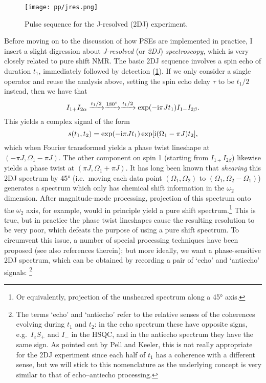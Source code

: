 \begin{figure}[htb]
    \centering
    \texttt{[image: pp/jres.png]}%
    \caption[2DJ pulse sequence]{Pulse sequence for the J-resolved (2DJ) experiment.}
    \label{fig:pp_jres}
\end{figure}

Before moving on to the discussion of how PSEs are implemented in practice, I insert a slight digression about \textit{J-resolved} (or \textit{2DJ}) \textit{spectroscopy}, which is very closely related to pure shift NMR.
The basic 2DJ sequence involves a spin echo of duration $t_1$, immediately followed by detection (\cref{fig:pp_jres}).
If we only consider a single operator and reuse the analysis above, setting the spin echo delay $\tau$ to be $t_1/2$ instead, then we have that
\begin{equation}
    \label{eq:2dj_operator_analysis}
    I_{1+}I_{2\alpha} \xrightarrow[]{t_1/2} \xrightarrow[]{\ang{180}} \xrightarrow[]{t_1/2} \exp(-\mathrm{i} \pi J t_1) I_{1-}I_{2\beta}.
\end{equation}
This yields a complex signal of the form
\begin{equation}
    \label{eq:2dj_signal}
    s(t_1, t_2) = \exp(-\mathrm{i}\pi J t_1) \exp[\mathrm{i}(\Omega_1 - \pi J) t_2],
\end{equation}
which when Fourier transformed yields a phase twist lineshape at $(-\pi J, \Omega_1 - \pi J)$.
The other component on spin 1 (starting from $I_{1+}I_{2\beta}$) likewise yields a phase twist at $(\pi J, \Omega_1 + \pi J)$.
It has long been known that \textit{shearing} this 2DJ spectrum by \ang{45} (i.e.\ moving each data point $(\Omega_1, \Omega_2)$ to $(\Omega_1, \Omega_2 - \Omega_1)$) generates a spectrum which only has chemical shift information in the $\omega_2$ dimension.
After magnitude-mode processing, projection of this spectrum onto the $\omega_2$ axis, for example, would in principle yield a pure shift spectrum.\footnote{Or equivalently, projection of the unsheared spectrum along a \ang{45} axis\autocite{Aue1976JCP}.}
This is true, but in practice the phase twist lineshapes cause the resulting resolution to be very poor, which defeats the purpose of using a pure shift spectrum.
To circumvent this issue, a number of special processing techniques have been proposed\autocite{Xu1991JMR,Nuzillard1996JMRSA,Simova1997JMR} (see also references therein); but more ideally, we want a phase-sensitive 2DJ spectrum, which can be obtained by recording a pair of `echo' and `antiecho' signals:%
\footnote{The terms `echo' and `antiecho' refer to the relative senses of the coherences evolving during $t_1$ and $t_2$: in the echo spectrum these have opposite signs, e.g.\ $I_zS_+$ and $I_-$ in the HSQC, and in the antiecho spectrum they have the same sign. As pointed out by Pell and Keeler\autocite{Pell2007JMR}, this is not really appropriate for the 2DJ experiment since each half of $t_1$ has a coherence with a different sense, but we will stick to this nomenclature as the underlying concept is very similar to that of echo--antiecho processing.}
